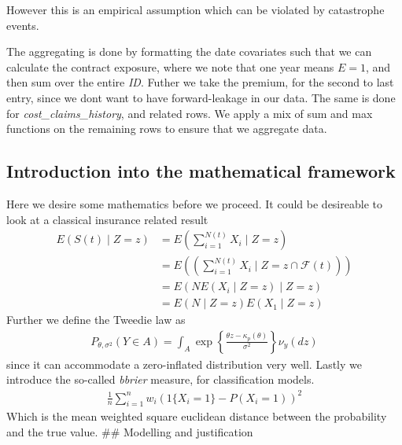 \documentclass[
]{article}
\begin{document}
However this is an empirical assumption which can be violated by
catastrophe events.

The aggregating is done by formatting the date covariates such that we
can calculate the contract exposure, where we note that one year means
\(E = 1\), and then sum over the entire \emph{ID}. Futher we take the
premium, for the second to last entry, since we dont want to have
forward-leakage in our data. The same is done for
\emph{cost\_claims\_history}, and related rows. We apply a mix of sum
and max functions on the remaining rows to ensure that we aggregate
data.

\subsection{Introduction into the mathematical
framework}\label{introduction-into-the-mathematical-framework}

Here we desire some mathematics before we proceed. It could be
desireable to look at a classical insurance related result \[ 
\begin{aligned*}
E(S(t) \mid Z=z) &= E\left(\sum_{i=1}^{N(t)} X_i \mid Z = z \right)\\
&= E\left( \left( \sum_{i=1}^{N(t)} X_i \mid Z = z \cap \mathcal{F}(t) \right)\right) \\
&=E\left( N E\left( X_i \mid Z = z \right)  \mid Z=z\right) \\
&= E(N \mid Z = z) E(X_1 \mid Z = z)
\end{aligned*}
\] Further we define the Tweedie law as \[
\begin{aligned*}
P_{\theta, \sigma^2}(Y \in A) = \int_A \exp\left\{ \frac{\theta z - \kappa_p(\theta)}{\sigma^2} \right\}\nu_y(dz)
\end{aligned*}
\] since it can accommodate a zero-inflated distribution very well.
Lastly we introduce the so-called \emph{bbrier} measure, for
classification models. \[
\begin{aligned*}
\frac{1}{n} \sum_{i=1}^n w_i(1\{X_i = 1 \} - P(X_i = 1))^2
\end{aligned*}
\] Which is the mean weighted square euclidean distance between the
probability and the true value. \#\# Modelling and justification
\end{document}
